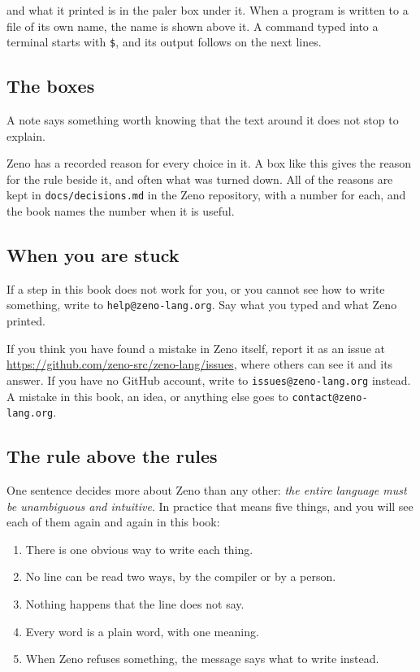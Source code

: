 and what it printed is in the paler box under it. When a program is
written to a file of its own name, the name is shown above it. A
command typed into a terminal starts with \verb|$|, and its output
follows on the next lines.

\subsection*{The boxes}

\begin{note}
A note says something worth knowing that the text around it does not
stop to explain.
\end{note}

\begin{why}
Zeno has a recorded reason for every choice in it. A box like this
gives the reason for the rule beside it, and often what was turned
down. All of the reasons are kept in \verb|docs/decisions.md| in the
Zeno repository, with a number for each, and the book names the number
when it is useful.
\end{why}

\subsection*{When you are stuck}

If a step in this book does not work for you, or you cannot see how to
write something, write to \texttt{help@zeno-lang.org}. Say what you
typed and what Zeno printed.

If you think you have found a mistake in Zeno itself, report it as an
issue at \url{https://github.com/zeno-src/zeno-lang/issues}, where
others can see it and its answer. If you have no GitHub account, write
to \texttt{issues@zeno-lang.org} instead. A mistake in this book, an
idea, or anything else goes to \texttt{contact@zeno-lang.org}.

\subsection*{The rule above the rules}

One sentence decides more about Zeno than any other: \emph{the entire
language must be unambiguous and intuitive}. In practice that means
five things, and you will see each of them again and again in this
book:

\begin{enumerate}
\item There is one obvious way to write each thing.
\item No line can be read two ways, by the compiler or by a person.
\item Nothing happens that the line does not say.
\item Every word is a plain word, with one meaning.
\item When Zeno refuses something, the message says what to write instead.
\end{enumerate}

